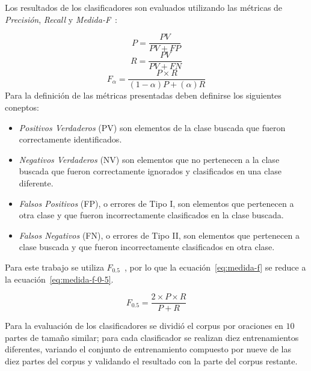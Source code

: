 \documentclass[runningheads,a4paper]{llncs}
\begin{document}
Los resultados de los clasificadores son evaluados utilizando las métricas de \emph{Precisión}, \emph{Recall} y \emph{Medida-F}~\cite{BIRD09}:

\begin{equation}
	\label{eq:precision}
	P = \frac{PV}{PV + FP}
\end{equation}
\begin{equation}
	\label{eq:recall}
	R = \frac{PV}{PV + FN}
\end{equation}
\begin{equation}
	\label{eq:medida-f}
	F_{\alpha} = \frac{P \times R}{(1 - \alpha)P + (\alpha)R}
\end{equation}
\newpage
Para la definición de las métricas presentadas deben definirse los siguientes coneptos:
\begin{itemize}
\item{\emph{Positivos Verdaderos} (PV) son elementos de la clase buscada que fueron correctamente identificados.}
\item{\emph{Negativos Verdaderos} (NV) son elementos que no pertenecen a la clase buscada que fueron correctamente ignorados y clasificados en una clase diferente.}
\item{\emph{Falsos Positivos} (FP), o errores de Tipo I, son elementos que pertenecen a otra clase y que fueron incorrectamente clasificados en la clase buscada.}
\item{\emph{Falsos Negativos} (FN), o errores de Tipo II, son elementos que pertenecen a clase buscada y que fueron incorrectamente clasificados en otra clase.}
\end{itemize}

Para este trabajo se utiliza $F_{0.5}$~\cite{MAKHOUL99}, por lo que la ecuación~\ref{eq:medida-f} se reduce a la ecuación~\ref{eq:medida-f-0-5}.

\begin{equation}
	\label{eq:medida-f-0-5}
	F_{0.5} = \frac{2 \times P \times R}{P + R}
\end{equation}

Para la evaluación de los clasificadores se dividió el corpus por oraciones en $10$ partes de tamaño similar; para cada clasificador se realizan diez entrenamientos diferentes, variando el conjunto de entrenamiento compuesto por nueve de las diez partes del corpus y validando el resultado con la parte del corpus restante. 
\end{document}

